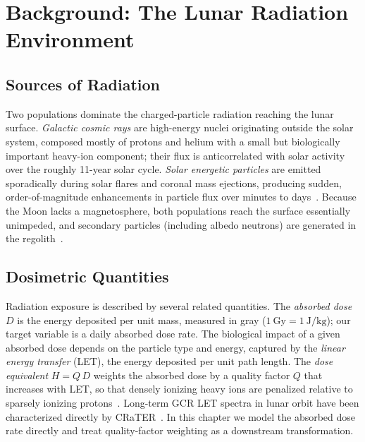 \documentclass[graybox]{SNmult}
\begin{document}
\section{Background: The Lunar Radiation Environment}
\label{sec:background}

\subsection{Sources of Radiation}
Two populations dominate the charged-particle radiation reaching the lunar
surface. \emph{Galactic cosmic rays} are high-energy nuclei originating outside
the solar system, composed mostly of protons and helium with a small but
biologically important heavy-ion component; their flux is anticorrelated with
solar activity over the roughly 11-year solar cycle. \emph{Solar energetic
particles} are emitted sporadically during solar flares and coronal mass
ejections, producing sudden, order-of-magnitude enhancements in particle flux
over minutes to days~\cite{durante2011physical}. Because the Moon lacks a
magnetosphere, both populations reach the surface essentially unimpeded, and
secondary particles (including albedo neutrons) are generated in the
regolith~\cite{Zhang2020,Wimmer2020}.

\subsection{Dosimetric Quantities}
Radiation exposure is described by several related quantities. The
\emph{absorbed dose} $D$ is the energy deposited per unit mass, measured in gray
($1~\mathrm{Gy} = 1~\mathrm{J/kg}$); our target variable is a daily absorbed
dose rate. The biological impact of a given absorbed dose depends on the
particle type and energy, captured by the \emph{linear energy transfer} (LET),
the energy deposited per unit path length. The \emph{dose equivalent} $H = Q\,D$
weights the absorbed dose by a quality factor $Q$ that increases with LET, so
that densely ionizing heavy ions are penalized relative to sparsely ionizing
protons~\cite{durante2011physical,cucinotta2014space}. Long-term GCR LET spectra
in lunar orbit have been characterized directly by
CRaTER~\cite{Looper2020,schwadron2012lunar}. In this chapter we model the absorbed dose rate directly and
treat quality-factor weighting as a downstream transformation.
\end{document}
